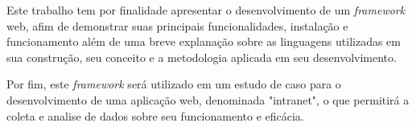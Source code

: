 Este trabalho tem por finalidade apresentar o desenvolvimento de um \emph{framework} web, afim de demonstrar suas principais funcionalidades, instalação e funcionamento além de uma breve explanação sobre as linguagens utilizadas em sua construção, seu conceito e a metodologia aplicada em seu desenvolvimento.

Por fim, este \emph{framework} será utilizado em um estudo de caso para o desenvolvimento de uma aplicação web, denominada "intranet", o que permitirá a coleta e analise de dados sobre seu funcionamento e eficácia.